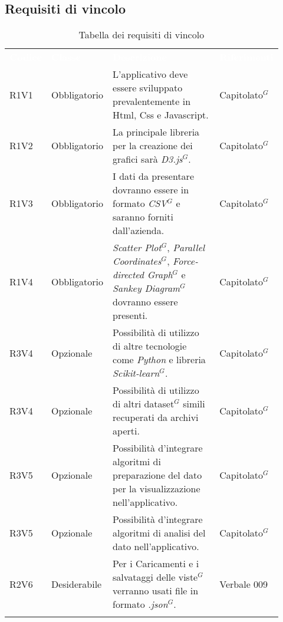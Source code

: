 \subsection{Requisiti di vincolo}
{\renewcommand{\arraystretch}{1.5}
\begin{longtable}{p{0.12\linewidth}p{0.15\linewidth}p{0.50\linewidth}p{0.15\linewidth}}
	\rowcolor[RGB]{33, 73, 50}
	\textcolor{white}{\textbf{Codice}} & \textcolor{white}{\textbf{Classe}} & \textcolor{white}{\textbf{Descrizione}} &
    \textcolor{white}{\textbf{Riferimenti}}\\

    \rowcolor[RGB]{216, 235, 171}
    R1V1 & Obbligatorio & L'applicativo deve essere sviluppato prevalentemente in Html, Css e Javascript. & Capitolato$^{G}$\\
    \rowcolor[RGB]{233, 245, 206}
    R1V2 & Obbligatorio & La principale libreria per la creazione dei grafici sarà \textit{D3.js}$^{G}$. & Capitolato$^{G}$\\
    \rowcolor[RGB]{216, 235, 171}
    R1V3 & Obbligatorio & I dati da presentare dovranno essere in formato \textit{CSV}$^{G}$ e saranno forniti dall'azienda.& Capitolato$^{G}$\\
    \rowcolor[RGB]{233, 245, 206}
    R1V4 & Obbligatorio & \textit{Scatter Plot}$^{G}$, \textit{Parallel Coordinates}$^{G}$, \textit{Force-directed Graph}$^{G}$ e \textit{Sankey Diagram}$^{G}$ dovranno essere presenti.& Capitolato$^{G}$\\
    \rowcolor[RGB]{216, 235, 171}
    R3V4 & Opzionale & Possibilità di utilizzo di altre tecnologie come \textit{Python} e libreria \textit{Scikit-learn}$^{G}$.& Capitolato$^{G}$\\
    \rowcolor[RGB]{233, 245, 206}
    R3V4 & Opzionale & Possibilità di utilizzo di altri dataset$^{G}$ simili recuperati da archivi aperti. & Capitolato$^{G}$ \\
    \rowcolor[RGB]{216, 235, 171}
    R3V5 & Opzionale & Possibilità d'integrare algoritmi di preparazione del dato per la visualizzazione nell'applicativo. & Capitolato$^{G}$\\
    \rowcolor[RGB]{233, 245, 206}
    R3V5 & Opzionale & Possibilità d'integrare algoritmi di analisi del dato nell'applicativo. & Capitolato$^{G}$\\
    \rowcolor[RGB]{216, 235, 171}
    R2V6 & Desiderabile & Per i Caricamenti e i salvataggi delle viste$^{G}$ verranno usati file in formato \textit{.json}$^{G}$. & Verbale 009\\

    \caption{Tabella dei requisiti di vincolo}
\end{longtable}
}

